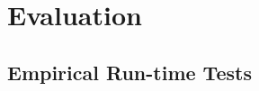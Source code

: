 \chapter{Evaluation}
\label{chapter:evaulation}

\section{Empirical Run-time Tests}


\newcommand{\experimentlength}{94.297655}
\newcommand{\experimentxaxismax}{100}
\newcommand{\experimentxscale}{0.08cm}
\newcommand{\experimentmarkscale}{0.75}
\newcommand{\experimentxaxispertick}{10}

